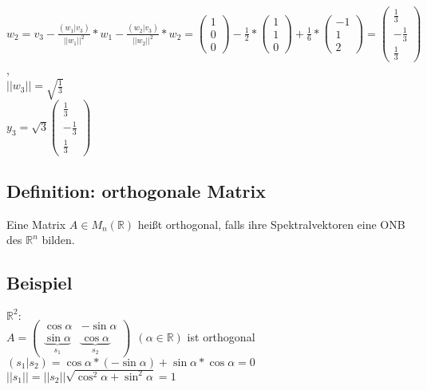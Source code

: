 \begin{enumerate}
$w_2=v_3-\frac{(w_1|v_3)}{||w_1||^2}*w_1-\frac{(w_2|v_3)}{||w_2||^2}*w_2 = \begin{pmatrix}1 \\ 0 \\ 0\end{pmatrix}-\frac{1}{2}*\begin{pmatrix}1 \\ 1 \\ 0\end{pmatrix}+\frac{1}{6}*\begin{pmatrix}-1 \\ 1 \\ 2\end{pmatrix}=\begin{pmatrix}\frac{1}{3} \\ -\frac{1}{3} \\ \frac{1}{3}\end{pmatrix}$,\\
$||w_3||=\sqrt{\frac{1}{3}}$\\
$y_3=\sqrt{3}\begin{pmatrix}\frac{1}{3} \\ -\frac{1}{3} \\ \frac{1}{3}\end{pmatrix}$
\end{enumerate}

\subsection{Definition: orthogonale Matrix}
Eine Matrix $A\in M_n(\mathbb{R})$ heißt orthogonal, falls ihre Spektralvektoren eine ONB des $\mathbb{R}^n$ bilden.

\subsection{Beispiel}
$\mathbb{R}^2:$\\
$A=\begin{pmatrix}\cos \alpha & -\sin \alpha\\ \underbrace{\sin \alpha}_{s_1} & \underbrace{\cos \alpha}_{s_2}\end{pmatrix} \ \ (\alpha\in\mathbb{R})$ ist orthogonal\\
$(s_1|s_2)=\cos \alpha*(-\sin \alpha) + \sin \alpha*\cos\alpha = 0$\\
$||s_1|| = ||s_2||\sqrt{\cos^2 \alpha + \sin^2 \alpha}=1$

